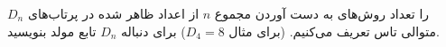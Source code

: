 \EXERCISE
$D_n$
را تعداد روش‌های به دست آوردن مجموع
$n$
از اعداد ظاهر شده در پرتاب‌های متوالی تاس تعریف می‌کنیم. (برای مثال
$D_4 = 8$)
برای دنباله
$D_n$
تابع مولد بنویسید.